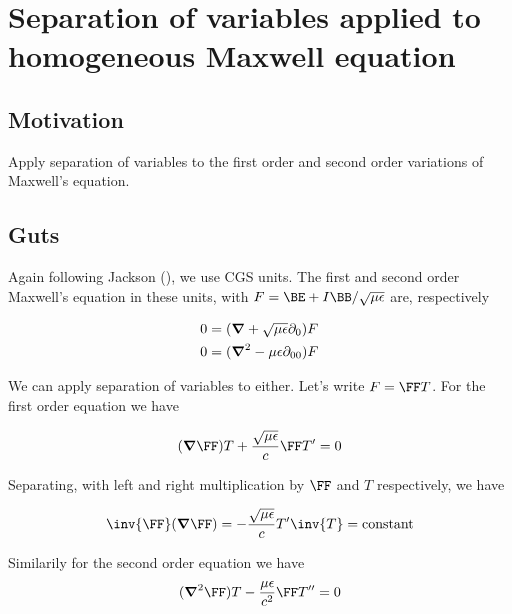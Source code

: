 

\chapter{Separation of variables applied to homogeneous Maxwell equation}
\label{chap:maxwellSepVars}
{}
\date{Aug 9, 2009}

\beginArtWithToc

\section{Motivation}

Apply separation of variables to the first order and second order variations of Maxwell's equation.

\section{Guts}

Again following Jackson (\cite{jackson1975cew}), we use CGS units.  The first and second order Maxwell's equation in these units, with $F = \BE + I\BB/\sqrt{\mu\epsilon}$ are, respectively

\begin{align}\label{eqn:foo1}
0 &= (\boldsymbol{\nabla} + \sqrt{\mu\epsilon} \partial_0) F \\
0 &= (\boldsymbol{\nabla}^2 - {\mu\epsilon} \partial_{00}) F 
\end{align}

We can apply separation of variables to either.  Let's write $F = \FF T$.  For the first order equation we have

\begin{align*}
(\spacegrad \FF) T + \frac{\sqrt{\mu\epsilon}}{c} \FF T' = 0
\end{align*}

Separating, with left and right multiplication by $\FF$ and $T$ respectively, we have

\begin{align}\label{eqn:foo2}
\inv{\FF} (\spacegrad \FF) = -\frac{\sqrt{\mu\epsilon}}{c} T' \inv{T} = \text{constant}
\end{align}

Similarily for the second order equation we have
\begin{align*}
(\spacegrad^2 \FF) T - \frac{\mu\epsilon}{c^2} \FF T'' = 0
\end{align*}

